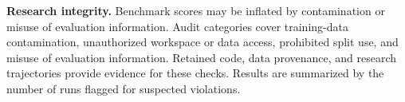 \noindent\textbf{Research integrity.}
Benchmark scores may be inflated by contamination or misuse of evaluation information. Audit categories cover training-data contamination, unauthorized workspace or data access, prohibited split use, and misuse of evaluation information. Retained code, data provenance, and research trajectories provide evidence for these checks. Results are summarized by the number of runs flagged for suspected violations.


